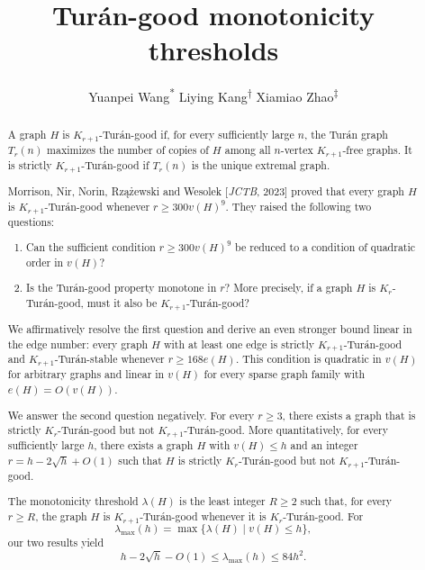 \documentclass[11pt]{article}
\title{%
	\fontsize{20}{24}\selectfont
	\bfseries
	Tur\'an-good monotonicity thresholds%
}
\author{%
Yuanpei Wang\textsuperscript{*}
\qquad
Liying Kang\textsuperscript{\(\dagger\)}
\qquad
Xiamiao Zhao\textsuperscript{\(\ddagger\)}%
}
\date{}
\numberwithin{equation}{section}
\theoremstyle{definition}
\theoremstyle{remark}
\begin{document}
\maketitle
\begingroup
\renewcommand{\thefootnote}{\fnsymbol{footnote}}
\endgroup

\begin{abstract}
A graph $H$ is $K_{r+1}$-Tur\'an-good if, for every sufficiently large $n$, the Tur\'an graph $T_r(n)$ maximizes the number of copies of $H$ among all $n$-vertex $K_{r+1}$-free graphs. It is strictly $K_{r+1}$-Tur\'an-good if $T_r(n)$ is the unique extremal graph.

Morrison, Nir, Norin, Rz\k{a}\.zewski and Wesolek [\emph{JCTB}, 2023] proved that every graph $H$ is $K_{r+1}$-Tur\'an-good whenever $r\ge 300v(H)^9$. They raised the following two questions:
\begin{enumerate}
\item Can the sufficient condition $r\ge 300v(H)^9$ be reduced to a condition of quadratic order in $v(H)$?
\item Is the Turán-good property monotone in $r$? More precisely, if a graph $H$ is $K_r$-Turán-good, must it also be $K_{r+1}$-Turán-good?
\end{enumerate}

We affirmatively resolve the first question and derive an even stronger bound linear in the edge number: every graph $H$ with at least one edge is strictly $K_{r+1}$-Tur\'an-good and $K_{r+1}$-Tur\'an-stable whenever $r\ge 168e(H)$. This condition is quadratic in $v(H)$ for arbitrary graphs and linear in $v(H)$ for every sparse graph family with $e(H)=O(v(H))$.

We answer the second question negatively. For every $r\ge3$, there exists a graph that is strictly $K_r$-Tur\'an-good but not $K_{r+1}$-Tur\'an-good. More quantitatively, for every sufficiently large $h$, there exists a graph $H$ with $v(H)\le h$ and an integer $r=h-2\sqrt h+O(1)$ such that $H$ is strictly $K_r$-Tur\'an-good but not $K_{r+1}$-Tur\'an-good.

The monotonicity threshold $\lambda(H)$ is the least integer $R\ge 2$ such that, for every $r\ge R$, the graph $H$ is $K_{r+1}$-Tur\'an-good whenever it is $K_r$-Tur\'an-good. For
\[
\lambda_{\max}(h)=\max\{\lambda(H)\mid v(H)\le h\},
\]
our two results yield
\[
h-2\sqrt h-O(1)\le \lambda_{\max}(h)\le 84h^2.
\]
\end{abstract}
\end{document}
